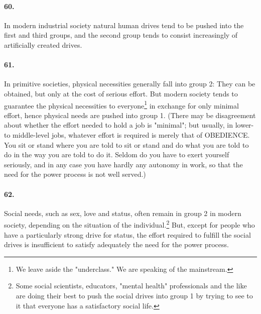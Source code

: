 \documentclass[12pt]{book}
\begin{document}
\paragraph{60.} In modern industrial society natural human drives tend to be pushed into the first and third groups, and the second group tends to consist increasingly of artificially created drives.


\paragraph{61.} In primitive societies, physical necessities generally fall into group 2: They can be obtained, but only at the cost of serious effort. But modern society tends to guarantee the physical necessities to everyone\footnote{We leave aside the "underclass." We are speaking of the mainstream.} in exchange for only minimal effort, hence physical needs are pushed into group 1.  (There may be disagreement about whether the effort needed to hold a job is "minimal"; but usually, in lower- to middle-level jobs, whatever effort is required is merely that of OBEDIENCE. You sit or stand where you are told to sit or stand and do what you are told to do in the way you are told to do it. Seldom do you have to exert yourself seriously, and in any case you have hardly any autonomy in work, so that the need for the power process is not well served.)


\paragraph{62.}  Social needs, such as sex, love and status, often remain in group 2 in modern society, depending on the situation of the individual.\footnote{Some social scientists, educators, "mental health" professionals and the like are doing their best to push the social drives into group 1 by trying to see to it that everyone has a satisfactory social life.} But, except for people who have a particularly strong drive for status, the effort required to fulfill the social drives is insufficient to satisfy adequately the need for the power process.
\end{document}
